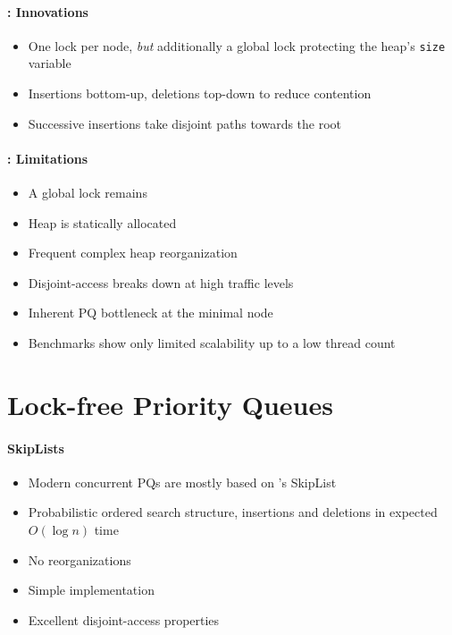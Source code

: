 \documentclass[usenames,dvipsnames]{beamer}
\begin{document}
\begin{frame}{}
\framesubtitle{\citeauthor{hunt1996efficient}: Innovations}

\begin{itemize}
\item One lock per node, \emph{but} additionally a global lock protecting the heap's
      \lstinline|size| variable
\item Insertions bottom-up, deletions top-down to reduce contention
\item Successive insertions take disjoint paths towards the root
\end{itemize}
\end{frame}

\begin{frame}{}
\framesubtitle{\citeauthor{hunt1996efficient}: Limitations}

\begin{itemize}
\item A global lock remains
\item Heap is statically allocated
\item Frequent complex heap reorganization
\item Disjoint-access breaks down at high traffic levels
\item Inherent PQ bottleneck at the minimal node
\item Benchmarks show only limited scalability up to a low thread count
\end{itemize}
\end{frame}

\section{Lock-free Priority Queues} \label{sec:lockfree}

\begin{frame}{}
\framesubtitle{SkipLists}

\begin{itemize}
\item Modern concurrent PQs are mostly based on \citeauthor{pugh1990skip}'s SkipList
\item Probabilistic ordered search structure, insertions and deletions in expected $O(\log n)$ time
\item No reorganizations
\item Simple implementation
\item Excellent disjoint-access properties
\end{itemize}
\end{frame}
\end{document}
